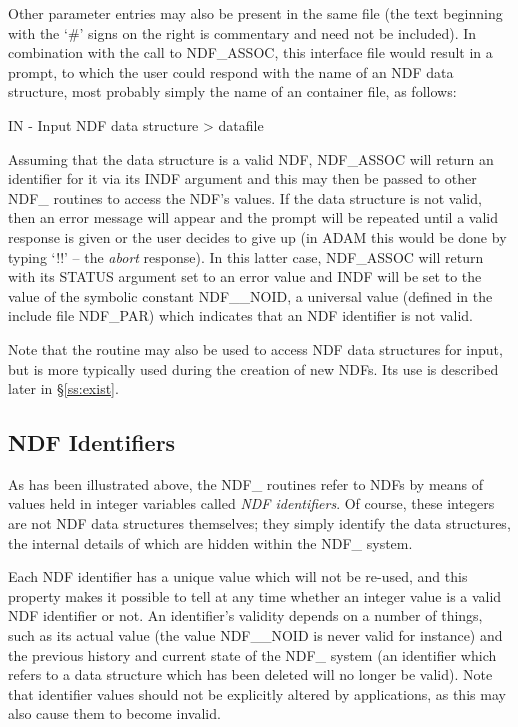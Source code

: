 \documentclass[twoside,11pt,nolof]{starlink}
\providecommand{\st}[1]{{\emph{#1}}}
\begin{document}
Other parameter entries may also be present in the same file (the text
beginning with the `\#' signs on the right is commentary and need not be
included).
In combination with the call to NDF\_ASSOC, this interface file would
result in a prompt, to which the user could respond with the name of
an NDF data structure, most probably simply the name of an
 container file, as follows:

\small
\begin{terminalv}
   IN - Input NDF data structure > datafile
\end{terminalv}
\normalsize

Assuming that the data structure is a valid NDF, NDF\_ASSOC will return an
identifier for it via its INDF argument and  this may then be passed to other
NDF\_ routines to access the NDF's values.
If the data structure is not valid, then an error message will appear
and the prompt will be repeated until a valid response is given or the
user decides to give up (in ADAM this would be done by typing `!!' --
the \st{abort\/} response).
In this latter case, NDF\_ASSOC will return with its STATUS argument set to
an error value and INDF will be set to the value of the symbolic constant
NDF\_\_NOID, a universal value (defined in the include file NDF\_PAR) which
indicates that an NDF identifier is not valid.

Note that the routine  may also be used to access NDF data
structures for input, but is more typically used during the creation of new
NDFs.
Its use is described later in \S\ref{ss:exist}.

\subsection{\label{ss:identifiers}NDF Identifiers}

As has been illustrated above, the NDF\_ routines refer to NDFs by means of
values held in integer variables called \st{NDF identifiers}.
Of course, these integers are not NDF data structures themselves; they simply
identify the data structures, the internal details of which are hidden within
the NDF\_ system.

Each NDF identifier has a unique value which will not be re-used, and this
property makes it possible to tell at any time whether an integer value is a
valid NDF identifier or not.
An identifier's validity depends on a number of things, such as its actual
value (the value NDF\_\_NOID is never valid for instance) and the previous
history and current state of the NDF\_ system (an identifier which refers to
a data structure which has been deleted will no longer be valid).
Note that identifier values should not be explicitly altered by
applications, as this may also cause them to become invalid.
\end{document}
